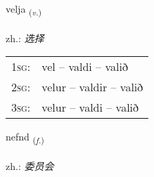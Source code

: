 \documentclass[frontgrid, backgrid]{flacards}\usepackage[]{graphicx}\usepackage[]{xcolor}
\begin{document}
\renewcommand{\blhead}{\vskip5pt {\small\bfseries\footnotesize Sagnorð | 动词 }}
\renewcommand{\bcfoot}{\vskip5pt \hspace{2pt}{\small\bfseries\footnotesize 1K}}


{velja \small{\textsubscript{(\textit{v.})}} \\[1ex] %
\textphonetic{[vɛlja]} \\
zh.: \emph{选择} \\  [2ex]
\renewcommand*{\arraystretch}{0.8}
\begin{tabular}{p{1cm}l}
\textsc{1sg}: & vel -- valdi -- valið \\ 
\textsc{2sg}: & velur -- valdir -- valið \\ 
\textsc{3sg}: & velur -- valdi -- valið \\ 
\end{tabular}
}

\renewcommand{\flhead}{\vskip5pt \fboxsep=0pt {\small\bfseries\footnotesize Nafnorð | 名词}}
\renewcommand{\fcfoot}{\vskip5pt \fboxsep=0pt \hspace{2pt}{\small\bfseries\footnotesize 1K}}

\renewcommand{\blhead}{\vskip5pt {\small\bfseries\footnotesize Nafnorð | 名词 }}
\renewcommand{\bcfoot}{\vskip5pt \hspace{2pt}{\small\bfseries\footnotesize 1K}}


{nefnd \small{\textsubscript{(\textit{f.})}} \\[1ex] %
\textphonetic{[nɛmt]} \\
zh.: \emph{委员会} \\  [2ex]
\renewcommand*{\arraystretch}{0.8}
}

\renewcommand{\flhead}{\vskip5pt \fboxsep=0pt {\small\bfseries\footnotesize Nafnorð | 名词}}
\renewcommand{\fcfoot}{\vskip5pt \fboxsep=0pt \hspace{2pt}{\small\bfseries\footnotesize 1K}}
\end{document}
